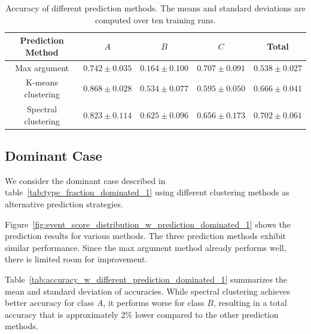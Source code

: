 \documentclass[12pt]{article}
\begin{document}
        \begin{table}[htpb]
            \centering
            \caption{Accuracy of different prediction methods. The means and standard deviations are computed over ten training runs.}
            \label{tab:accuracy_w_different_prediction_ambiguous}
            \begin{tabular}{c|ccc|c}
                Prediction Method   & $A$               & $B$               & $C$               & Total             \\ \hline
                Max argument        & $0.742 \pm 0.035$ & $0.164 \pm 0.100$ & $0.707 \pm 0.091$ & $0.538 \pm 0.027$ \\
                K-means clustering  & $0.868 \pm 0.028$ & $0.534 \pm 0.077$ & $0.595 \pm 0.050$ & $0.666 \pm 0.041$ \\
                Spectral clustering & $0.823 \pm 0.114$ & $0.625 \pm 0.096$ & $0.656 \pm 0.173$ & $0.702 \pm 0.061$
            \end{tabular}
        \end{table}
    \subsection{Dominant Case}  
    \label{sub:dominated_case}  
        We consider the dominant case described in table~\ref{tab:type_fraction_dominated_1} using different clustering methods as alternative prediction strategies.  

        Figure~\ref{fig:event_score_distribution_w_prediction_dominated_1} shows the prediction results for various methods. The three prediction methods exhibit similar performance. Since the max argument method already performs well, there is limited room for improvement.  

        Table~\ref{tab:accuracy_w_different_prediction_dominated_1} summarizes the mean and standard deviation of accuracies. While spectral clustering achieves better accuracy for class $A$, it performs worse for class $B$, resulting in a total accuracy that is approximately 2\% lower compared to the other prediction methods.  
\end{document}
